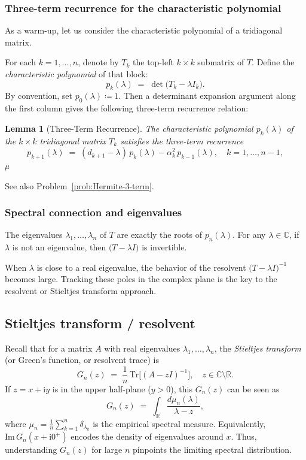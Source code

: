 \documentclass[letterpaper,11pt,oneside,reqno]{article}
\numberwithin{equation}{section}
\newtheorem{lemma}[proposition]{Lemma}
\theoremstyle{definition}
\begin{document}
\subsubsection{Three-term recurrence for the characteristic polynomial}

As a warm-up, let us consider the characteristic polynomial of a tridiagonal matrix.

For each \(k=1,\dots,n\), denote by \(T_k\) the top-left \(k\times k\) submatrix of \(T\).  Define the \emph{characteristic polynomial} of that block:
\[
  p_k(\lambda) \;=\; \det\bigl(T_k - \lambda I_k\bigr).
\]
By convention, set \(p_0(\lambda)\coloneqq 1\).  Then a determinant expansion argument along the first column gives the following three-term recurrence relation:

\begin{lemma}[Three-Term Recurrence]
\label{lem:3term}
The characteristic polynomial \(p_k(\lambda)\) of the \(k\times k\) tridiagonal matrix \(T_k\) satisfies the three-term recurrence
\[
	p_{k+1}(\lambda)
	\;=\;
	(d_{k+1} - \lambda)\,p_k(\lambda) - \alpha_k^2\,p_{k-1}(\lambda),
	\quad
	k=1,\dots,n-1,
\]µ

\end{lemma}

See also Problem~\ref{prob:Hermite-3-term}.

\subsubsection{Spectral connection and eigenvalues}

The eigenvalues \(\lambda_1,\dots,\lambda_n\) of \(T\) are exactly the roots of \(p_n(\lambda)\).  For any \(\lambda \in \mathbb{C}\), if \(\lambda\) is not an eigenvalue, then \(\bigl(T - \lambda I\bigr)\) is invertible.

When \(\lambda\) is close to a real eigenvalue, the behavior of the resolvent \(\bigl(T-\lambda I\bigr)^{-1}\) becomes large.  Tracking these poles in the complex plane is the key to the resolvent or Stieltjes transform approach.

\subsection{Stieltjes transform / resolvent}
\label{sec:stieltjes-def}

Recall that for a matrix \(A\) with real eigenvalues \(\lambda_1,\dots,\lambda_n\), the \emph{Stieltjes transform} (or Green’s function, or resolvent trace) is
\[
  G_n(z)
  \;=\;
  \frac{1}{n}\,\mathrm{Tr}\bigl[(A - zI)^{-1}\bigr],
  \quad
  z\in \mathbb{C}\setminus\mathbb{R}.
\]
If \(z=x+\mathrm{i}y\) is in the upper half-plane (\(y>0\)), this $G_n(z)$ can be seen as
\[
  G_n(z)
  \;=\;
  \int_{\mathbb{R}}\!\!\frac{d\mu_n(\lambda)}{\lambda - z},
\]
where \(\mu_n = \frac{1}{n}\sum_{k=1}^n \delta_{\lambda_k}\) is the empirical spectral measure.  Equivalently, \(\mathrm{Im}\,G_n(x+\mathrm{i}0^+)\) encodes the density of eigenvalues around \(x\).  Thus, understanding $G_n(z)$ for large $n$ pinpoints the limiting spectral distribution.
\end{document}
